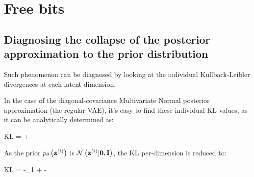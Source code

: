\section{Free bits}

\subsection{Diagnosing the collapse of the posterior approximation to the prior distribution}

Such phenomenon can be diagnosed by looking at the individual Kullback-Leibler divergences
at each latent dimension.

In the case of the diagonal-covariance Multivariate Normal posterior approximation
(the regular VAE), it's easy to find these individual KL values, as it can be analytically determined as:

\begin{nalign}
KL = \log {} + -
\end{nalign}

As the prior $p_\theta\left({\mathbf{z}^{(i)}}\right)$ is $\mathcal{N}\left({\mathbf{z}^{(i)}}|\mathbf{0},\mathbf{I}\right)$, the KL per-dimension is reduced to:

\begin{nalign}
KL = -\log \sigma_1 + -
\end{nalign}
